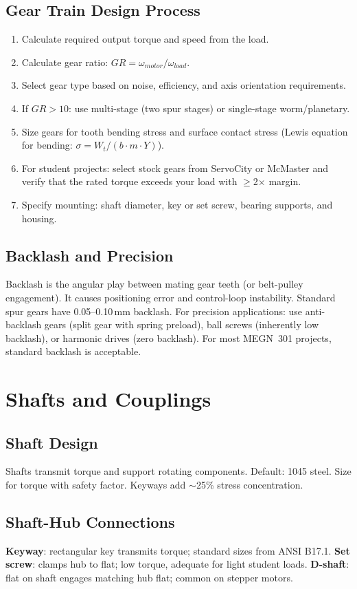 \subsection{Gear Train Design Process}
\begin{enumerate}[nosep,leftmargin=1.5em]
\item Calculate required output torque and speed from the load.
\item Calculate gear ratio: $GR = \omega_{motor} / \omega_{load}$.
\item Select gear type based on noise, efficiency, and axis orientation requirements.
\item If $GR > 10$: use multi-stage (two spur stages) or single-stage worm/planetary.
\item Size gears for tooth bending stress and surface contact stress (Lewis equation for bending: $\sigma = W_t / (b \cdot m \cdot Y)$).
\item For student projects: select stock gears from ServoCity or McMaster and verify that the rated torque exceeds your load with $\geq$2$\times$ margin.
\item Specify mounting: shaft diameter, key or set screw, bearing supports, and housing.
\end{enumerate}

\subsection{Backlash and Precision}
Backlash is the angular play between mating gear teeth (or belt-pulley engagement). It causes positioning error and control-loop instability. Standard spur gears have 0.05--0.10\,mm backlash. For precision applications: use anti-backlash gears (split gear with spring preload), ball screws (inherently low backlash), or harmonic drives (zero backlash). For most MEGN~301 projects, standard backlash is acceptable.

\section{Shafts and Couplings}
\subsection{Shaft Design}
Shafts transmit torque and support rotating components. Default: 1045 steel. Size for torque with safety factor. Keyways add $\sim$25\% stress concentration.

\subsection{Shaft-Hub Connections}
\textbf{Keyway}: rectangular key transmits torque; standard sizes from ANSI B17.1. \textbf{Set screw}: clamps hub to flat; low torque, adequate for light student loads. \textbf{D-shaft}: flat on shaft engages matching hub flat; common on stepper motors.


